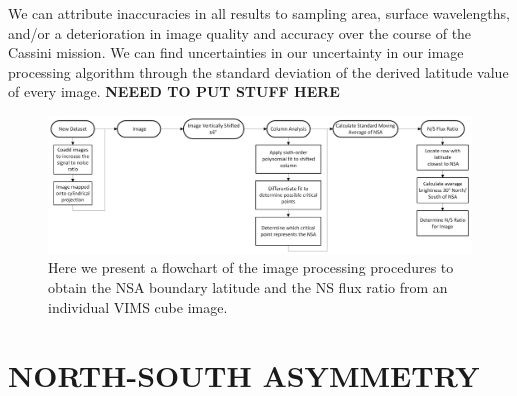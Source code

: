 \documentclass[apj,tighten]{emulateapj}
\begin{document}
We can attribute inaccuracies in all results to sampling area, surface wavelengths, and/or a deterioration in image quality and accuracy over the course of the Cassini mission. We can find uncertainties in our uncertainty in our image processing algorithm through the standard deviation of the derived latitude value of every image. \textbf{NEEED TO PUT STUFF HERE}


\begin{figure}[!hb]
\includegraphics[width=\textwidth]{figures/NS Flowchart.png}
\caption{\footnotesize Here we present a flowchart of the image processing procedures to obtain the NSA boundary latitude and the NS flux ratio from an individual VIMS cube image.
\label{figure:flowchart}}
\end{figure}


\section{NORTH-SOUTH ASYMMETRY} \label{nsa}
\end{document}
